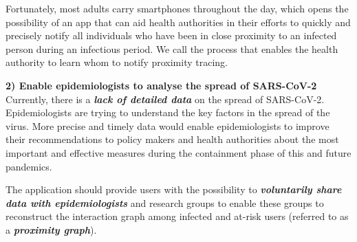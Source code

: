 \documentclass[12pt,a4paper]{article}
\begin{document}
Fortunately, most adults carry smartphones throughout the day, which opens the possibility
of an app that can aid health authorities in their efforts to quickly and precisely notify all individuals who have been in close proximity to an infected person during an infectious period. We call the process that enables the health authority to learn whom to notify proximity tracing.

\textbf{2) Enable epidemiologists to analyse the spread of SARS-CoV-2}\\
Currently, there is a \textbf{\textit{lack of detailed data}} on the spread of SARS-CoV-2. Epidemiologists
are trying to understand the key factors in the spread of the virus. More precise and timely
data would enable epidemiologists to improve their recommendations to policy makers and
health authorities about the most important and effective measures during the containment
phase of this and future pandemics.

The application should provide users with the possibility to \textbf{\textit{voluntarily share data with epidemiologists}} and research groups to enable these groups to reconstruct the interaction graph among infected and at-risk users (referred to as a \textbf{\textit{proximity graph}}).
\end{document}
